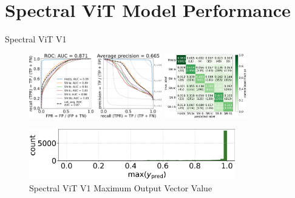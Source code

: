 \section[Model Performance]{Spectral ViT Model Performance}
\begin{frame}{Spectral ViT V1}
    \begin{figure}
        \centering
        \includegraphics[height=2.8cm]{figures/Presentation/v1/vit_model_V1_original_redorocfulle_e31.png}
        \quad
        \includegraphics[height=2.8cm]{figures/Presentation/v1/vit_model_V1_original_redocmfull_e31.png}
        \caption{Spectral ViT V1 Classifier\label{fig:v1_qual}}
        \pause

        \includegraphics[width=0.8\textwidth]{figures/Presentation/v1/vit_model_V1_original_redomax_ypred_binary_31.png}
        \caption{Spectral ViT V1 Maximum Output Vector Value\label{fig:v1_max}}
    \end{figure}
\end{frame}

